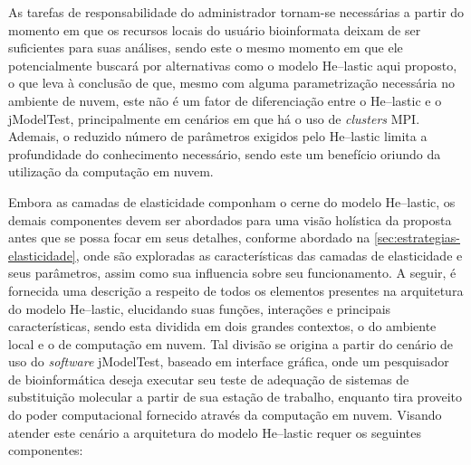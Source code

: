 \documentclass[english,brazilian]{UNISINOSmonografia} %
\begin{document}
As tarefas de responsabilidade do administrador tornam-se necessárias a partir do momento em que os recursos locais do usuário bioinformata deixam de ser suficientes para suas análises, sendo este o mesmo momento em que ele potencialmente buscará por alternativas como o modelo \textsf{He}--lastic aqui proposto, o que leva à conclusão de que, mesmo com alguma parametrização necessária no ambiente de nuvem, este não é um fator de diferenciação entre o \textsf{He}--lastic e o jModelTest, principalmente em cenários em que há o uso de \textit{clusters} MPI.
Ademais, o reduzido número de parâmetros exigidos pelo \textsf{He}--lastic limita a profundidade do conhecimento necessário, sendo este um benefício oriundo da utilização da computação em nuvem.


Embora as camadas de elasticidade componham o cerne do modelo \textsf{He}--lastic, os demais componentes devem ser abordados para uma visão holística da proposta antes que se possa focar em seus detalhes, conforme abordado na \autoref{sec:estrategias-elasticidade}, onde são exploradas as características das camadas de elasticidade e seus parâmetros, assim como sua influencia sobre seu funcionamento.
A seguir, é fornecida uma descrição a respeito de todos os elementos presentes na arquitetura do modelo \textsf{He}--lastic, elucidando suas funções, interações e principais características, sendo esta dividida em dois grandes contextos, o do ambiente local e o de computação em nuvem.
Tal divisão se origina a partir do cenário de uso do \textit{software} jModelTest, baseado em interface gráfica, onde um pesquisador de bioinformática deseja executar seu teste de adequação de sistemas de substituição molecular a partir de sua estação de trabalho, enquanto tira proveito do poder computacional fornecido através da computação em nuvem.
Visando atender este cenário a arquitetura do modelo \textsf{He}--lastic requer os seguintes componentes:
\end{document}
